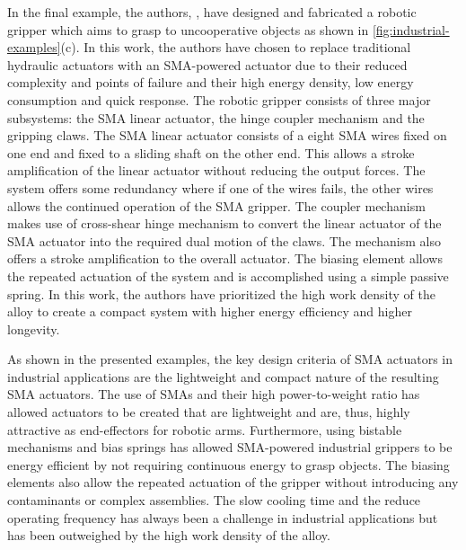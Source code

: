 In the final example, the authors, \todocite, have designed and fabricated a robotic gripper which aims to grasp to uncooperative objects as shown in \cref{fig:industrial-examples}(c). In this work, the authors have chosen to replace traditional hydraulic actuators with an SMA-powered actuator due to their reduced complexity and points of failure and their high energy density, low energy consumption and quick response. The robotic gripper consists of three major subsystems: the SMA linear actuator, the hinge coupler mechanism and the gripping claws. The SMA linear actuator consists of a eight SMA wires fixed on one end and fixed to a sliding shaft on the other end. This allows a stroke amplification of the linear actuator without reducing the output forces. The system offers some redundancy where if one of the wires fails, the other wires allows the continued operation of the SMA gripper. The coupler mechanism makes use of cross-shear hinge mechanism to convert the linear actuator of the SMA actuator into the required dual motion of the claws. The mechanism also offers a stroke amplification to the overall actuator. The biasing element allows the repeated actuation of the system and is accomplished using a simple passive spring. In this work, the authors have prioritized the high work density of the alloy to create a compact system with higher energy efficiency and higher longevity.

As shown in the presented examples, the key design criteria of SMA actuators in industrial applications are the lightweight and compact nature of the resulting SMA actuators. The use of SMAs and their high power-to-weight ratio has allowed actuators to be created that are lightweight and are, thus, highly attractive as end-effectors for robotic arms. Furthermore, using bistable mechanisms and bias springs has allowed SMA-powered industrial grippers to be energy efficient by not requiring continuous energy to grasp objects. The biasing elements also allow the repeated actuation of the gripper without introducing any contaminants or complex assemblies. The slow cooling time and the reduce operating frequency has always been a challenge in industrial applications but has been outweighed by the high work density of the alloy.

